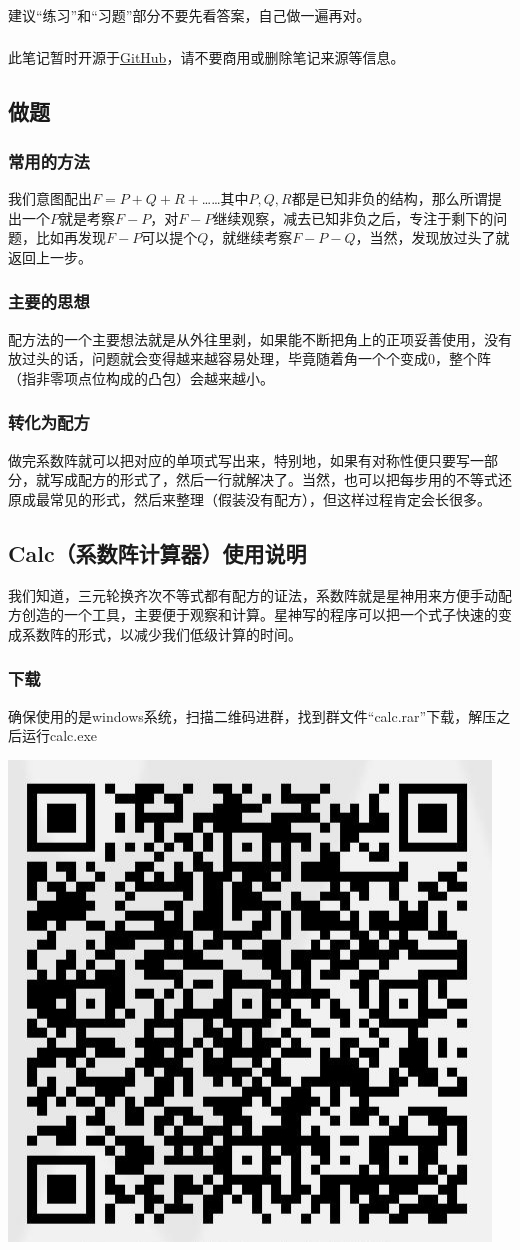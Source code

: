 \documentclass[UTF8]{ctexart}
\begin{document}
\subsubsection{}建议“练习”和“习题”部分不要先看答案，自己做一遍再对。
\subsubsection{}
此笔记暂时开源于\href{https://github.com/Raymond0Hui/LaTeXwork-open}{GitHub}，请不要商用或删除笔记来源等信息。
\subsection{做题}
\subsubsection{常用的方法}
我们意图配出$ F=P+Q+R+ $……其中$ P,Q,R $都是已知非负的结构，那么所谓提出一个$ P $就是考察$ F-P $，对$ F-P $继续观察，减去已知非负之后，专注于剩下的问题，比如再发现$ F-P $可以提个$ Q $，就继续考察$ F-P-Q $，当然，发现放过头了就返回上一步。
\subsubsection{主要的思想}
配方法的一个主要想法就是从外往里剥，如果能不断把角上的正项妥善使用，没有放过头的话，问题就会变得越来越容易处理，毕竟随着角一个个变成0，整个阵（指非零项点位构成的凸包）会越来越小。
\subsubsection{转化为配方}
做完系数阵就可以把对应的单项式写出来，特别地，如果有对称性便只要写一部分，就写成配方的形式了，然后一行就解决了。当然，也可以把每步用的不等式还原成最常见的形式，然后来整理（假装没有配方），但这样过程肯定会长很多。
\subsection{Calc（系数阵计算器）使用说明}
我们知道，三元轮换齐次不等式都有配方的证法，系数阵就是星神用来方便手动配方创造的一个工具，主要便于观察和计算。星神写的程序可以把一个式子快速的变成系数阵的形式，以减少我们低级计算的时间。
\subsubsection{下载}
确保使用的是windows系统，扫描二维码进群，找到群文件“calc.rar”下载，解压之后运行calc.exe
\begin{center}
	\includegraphics[width=0.25\linewidth]{z01}
\end{center}
\end{document}
